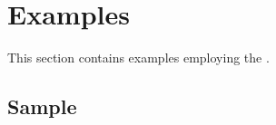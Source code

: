 
\section{Examples}
\label{examples}

This section contains examples employing the \sbmlthreepkg.

\subsection{Sample}
\label{examples-title}




